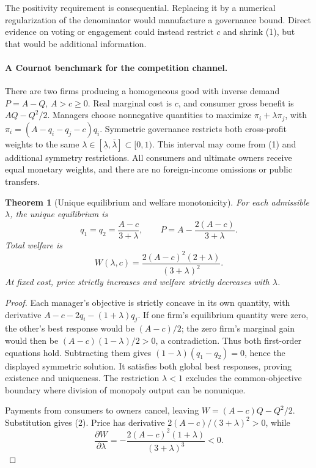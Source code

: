 \documentclass[11pt]{article}
\newtheorem{theorem}{Theorem}
\theoremstyle{definition}
\begin{document}
The positivity requirement is consequential. Replacing it by a numerical regularization of the denominator would manufacture a governance bound. Direct evidence on voting or engagement could instead restrict $c$ and shrink (1), but that would be additional information.

\paragraph{A Cournot benchmark for the competition channel.}
There are two firms producing a homogeneous good with inverse demand $P=A-Q$, $A>c\geq0$. Real marginal cost is $c$, and consumer gross benefit is $AQ-Q^2/2$. Managers choose nonnegative quantities to maximize $\pi_i+\lambda\pi_j$, with $\pi_i=(A-q_i-q_j-c)q_i$. Symmetric governance restricts both cross-profit weights to the same $\lambda\in[\underline\lambda,\overline\lambda]\subset[0,1)$. This interval may come from (1) and additional symmetry restrictions. All consumers and ultimate owners receive equal monetary weights, and there are no foreign-income omissions or public transfers.

\begin{theorem}[Unique equilibrium and welfare monotonicity]
For each admissible $\lambda$, the unique equilibrium is
\[
 q_1=q_2=\frac{A-c}{3+\lambda},\qquad
 P=A-\frac{2(A-c)}{3+\lambda}.
\]
Total welfare is
\[
 W(\lambda,c)=\frac{2(A-c)^2(2+\lambda)}{(3+\lambda)^2}.
 \tag{2}
\]
At fixed cost, price strictly increases and welfare strictly decreases with $\lambda$.
\end{theorem}
\begin{proof}
Each manager's objective is strictly concave in its own quantity, with derivative $A-c-2q_i-(1+\lambda)q_j$. If one firm's equilibrium quantity were zero, the other's best response would be $(A-c)/2$; the zero firm's marginal gain would then be $(A-c)(1-\lambda)/2>0$, a contradiction. Thus both first-order equations hold. Subtracting them gives $(1-\lambda)(q_1-q_2)=0$, hence the displayed symmetric solution. It satisfies both global best responses, proving existence and uniqueness. The restriction $\lambda<1$ excludes the common-objective boundary where division of monopoly output can be nonunique.

Payments from consumers to owners cancel, leaving $W=(A-c)Q-Q^2/2$. Substitution gives (2). Price has derivative $2(A-c)/(3+\lambda)^2>0$, while
\[
 \frac{\partial W}{\partial\lambda}
 =-\frac{2(A-c)^2(1+\lambda)}{(3+\lambda)^3}<0.
\]
\end{proof}
\end{document}
